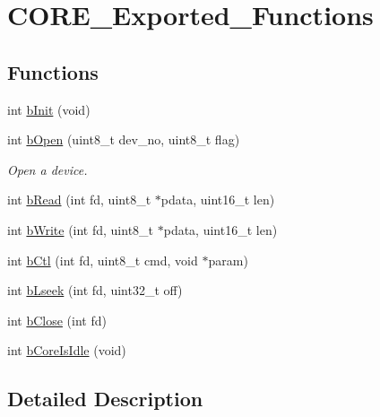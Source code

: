 \hypertarget{group___c_o_r_e___exported___functions}{}\section{C\+O\+R\+E\+\_\+\+Exported\+\_\+\+Functions}
\label{group___c_o_r_e___exported___functions}
\subsection*{Functions}
\begin{DoxyCompactItemize}
\item 
int \mbox{\hyperlink{group___c_o_r_e___exported___functions_gad02e8fddcae0585773c027e81bba5f2c}{b\+Init}} (void)
\item 
int \mbox{\hyperlink{group___c_o_r_e___exported___functions_ga249e47165f733672eae3653fcca87829}{b\+Open}} (uint8\+\_\+t dev\+\_\+no, uint8\+\_\+t flag)
\begin{DoxyCompactList}\small\item\em Open a device. \end{DoxyCompactList}\item 
int \mbox{\hyperlink{group___c_o_r_e___exported___functions_ga19ddb6f8ca523b3b28b74ea6a1519e3b}{b\+Read}} (int fd, uint8\+\_\+t $\ast$pdata, uint16\+\_\+t len)
\item 
int \mbox{\hyperlink{group___c_o_r_e___exported___functions_ga078b200cdc68be6d562cc1ad323d9381}{b\+Write}} (int fd, uint8\+\_\+t $\ast$pdata, uint16\+\_\+t len)
\item 
int \mbox{\hyperlink{group___c_o_r_e___exported___functions_gaf0a95eb51c436b56de56cdc63f5dab7c}{b\+Ctl}} (int fd, uint8\+\_\+t cmd, void $\ast$param)
\item 
int \mbox{\hyperlink{group___c_o_r_e___exported___functions_gad49412624e7b58f0b90ff43e60823eb1}{b\+Lseek}} (int fd, uint32\+\_\+t off)
\item 
int \mbox{\hyperlink{group___c_o_r_e___exported___functions_ga2d5143bd4493f8069401bb433939de4f}{b\+Close}} (int fd)
\item 
int \mbox{\hyperlink{group___c_o_r_e___exported___functions_ga2579ab6e79fad3d62796972ab85a14f0}{b\+Core\+Is\+Idle}} (void)
\end{DoxyCompactItemize}


\subsection{Detailed Description}


